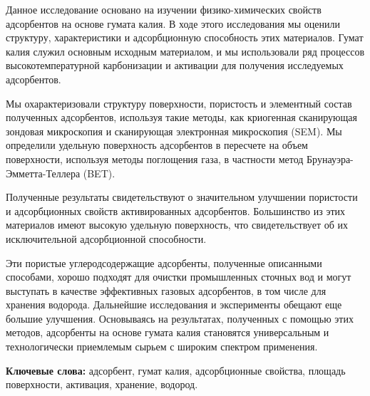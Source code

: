 Данное исследование основано на изучении физико-химических свойств
адсорбентов на основе гумата калия. В ходе этого исследования мы оценили
структуру, характеристики и адсорбционную способность этих материалов.
Гумат калия служил основным исходным материалом, и мы использовали ряд
процессов высокотемпературной карбонизации и активации для получения
исследуемых адсорбентов.

Мы охарактеризовали структуру поверхности, пористость и элементный
состав полученных адсорбентов, используя такие методы, как криогенная
сканирующая зондовая микроскопия и сканирующая электронная микроскопия
(SEM). Мы определили удельную поверхность адсорбентов в пересчете на
объем поверхности, используя методы поглощения газа, в частности метод
Брунауэра-Эмметта-Теллера (BET).

Полученные результаты свидетельствуют о значительном улучшении
пористости и адсорбционных свойств активированных адсорбентов.
Большинство из этих материалов имеют высокую удельную поверхность, что
свидетельствует об их исключительной адсорбционной способности.

Эти пористые углеродсодержащие адсорбенты, полученные описанными
способами, хорошо подходят для очистки промышленных сточных вод и могут
выступать в качестве эффективных газовых адсорбентов, в том числе для
хранения водорода. Дальнейшие исследования и эксперименты обещают еще
большие улучшения. Основываясь на результатах, полученных с помощью этих
методов, адсорбенты на основе гумата калия становятся универсальным и
технологически приемлемым сырьем с широким спектром применения.

{\bfseries Ключевые слова:} адсорбент, гумат калия, адсорбционные свойства,
площадь поверхности, активация, хранение, водород.

